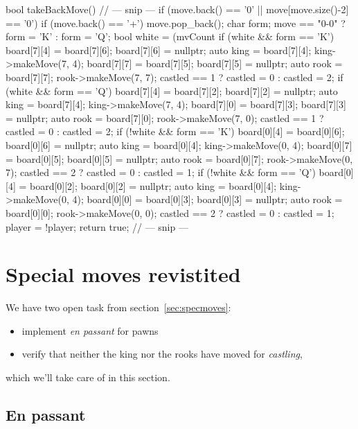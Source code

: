 \begin{cpp}
bool takeBackMove() {
  // --- snip ---
  if (move.back() == '0' || move[move.size()-2] == '0') {
    if (move.back() == '+') move.pop_back();
    char form;
    move == "0-0" ? form = 'K' : form = 'Q';
    bool white = (mvCount %
    if (white && form == 'K') {
      board[7][4] = board[7][6];
      board[7][6] = nullptr;
      auto king = board[7][4];
      king->makeMove(7, 4);
      board[7][7] = board[7][5];
      board[7][5] = nullptr;
      auto rook = board[7][7];
      rook->makeMove(7, 7);
      castled == 1 ? castled = 0 : castled = 2;
    }
    if (white && form == 'Q') {
      board[7][4] = board[7][2];
      board[7][2] = nullptr;
      auto king = board[7][4];
      king->makeMove(7, 4);
      board[7][0] = board[7][3];
      board[7][3] = nullptr;
      auto rook = board[7][0];
      rook->makeMove(7, 0);
      castled == 1 ? castled = 0 : castled = 2;
    }
    if (!white && form == 'K') {
      board[0][4] = board[0][6];
      board[0][6] = nullptr;
      auto king = board[0][4];
      king->makeMove(0, 4);
      board[0][7] = board[0][5];
      board[0][5] = nullptr;
      auto rook = board[0][7];
      rook->makeMove(0, 7);
      castled == 2 ? castled = 0 : castled = 1;
    }
    if (!white && form == 'Q') {
      board[0][4] = board[0][2];
      board[0][2] = nullptr;
      auto king = board[0][4];
      king->makeMove(0, 4);
      board[0][0] = board[0][3];
      board[0][3] = nullptr;
      auto rook = board[0][0];
      rook->makeMove(0, 0);
      castled == 2 ? castled = 0 : castled = 1;
    }
    player = !player;
    return true;
  }
  // --- snip ---
}
\end{cpp}


\section{Special moves revistited}

We have two open task from section~\ref{sec:specmoves}:
\begin{itemize}
  \item implement \emph{en passant} for pawns
  \item verify that neither the king nor the rooks have moved for \emph{castling},
\end{itemize}

which we'll take care of in this section.

\subsection{En passant}


